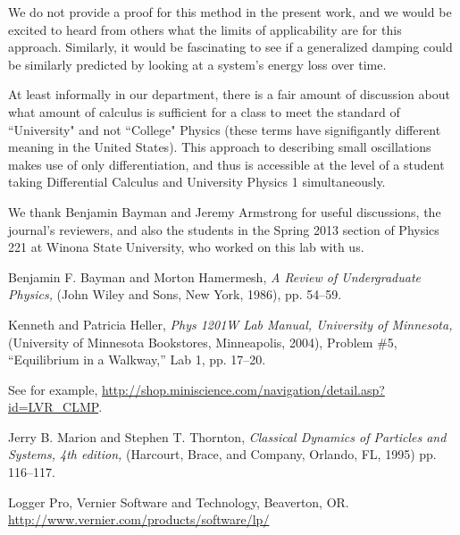 \documentclass[12pt]{iopart}
\begin{document}
We do not provide a proof for this method in the present work, and we would be excited to heard from others what the limits of applicability are for this approach.  Similarly, it would be fascinating to see if a generalized  damping could be similarly predicted by looking at a system's energy loss over time.   

At least informally in our department, there is a fair amount of discussion about what amount of calculus is sufficient for a class to meet the standard of ``University" and not ``College" Physics (these terms have signifigantly different meaning in the United States).  This approach to describing small oscillations makes use of only differentiation, and thus is accessible at the level of a student taking Differential Calculus and University Physics 1 simultaneously. 

We thank Benjamin Bayman and Jeremy Armstrong for useful discussions, the journal's reviewers, and also the students in the Spring 2013 section of Physics 221 at Winona State University, who worked on this lab with us.






\begin{thebibliography}{5}
 
Benjamin F. Bayman and Morton Hamermesh,
\textit{A Review of Undergraduate Physics,}
(John Wiley and Sons, New York, 1986),
pp. 54--59.

 Kenneth and Patricia Heller,
\textit{Phys 1201W Lab Manual, University of Minnesota,}
(University of Minnesota Bookstores, Minneapolis, 2004),
Problem \#5, ``Equilibrium in a Walkway,'' Lab 1, pp. 17--20.

See for example, \href{http://shop.miniscience.com/navigation/detail.asp?id=LVR_CLMP}{http://shop.miniscience.com/navigation/detail.asp?id=LVR\_CLMP}. 

Jerry B.  Marion and Stephen T. Thornton,
\textit{Classical Dynamics of Particles and Systems, 4th edition,}
(Harcourt, Brace, and Company, Orlando, FL, 1995)
pp. 116--117.

Logger Pro,
Vernier Software and Technology, 
Beaverton, OR.
\href{http://www.vernier.com/products/software/lp/}{http://www.vernier.com/products/software/lp/}


\end{thebibliography}
\end{document}
